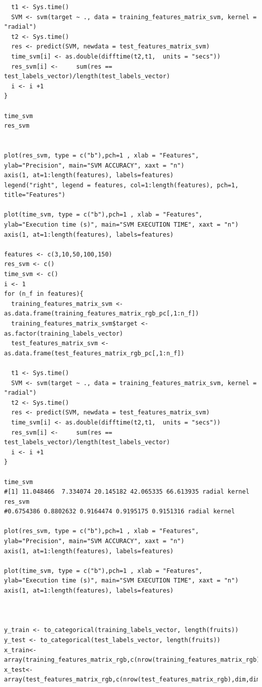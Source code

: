 \documentclass{article}
\begin{document}
\begin{verbatim}
  t1 <- Sys.time()
  SVM <- svm(target ~ ., data = training_features_matrix_svm, kernel = "radial")
  t2 <- Sys.time()
  res <- predict(SVM, newdata = test_features_matrix_svm)
  time_svm[i] <- as.double(difftime(t2,t1,  units = "secs"))
  res_svm[i] <-     sum(res == test_labels_vector)/length(test_labels_vector)
  i <- i +1
}

time_svm
res_svm


plot(res_svm, type = c("b"),pch=1 , xlab = "Features", 
ylab="Precision", main="SVM ACCURACY", xaxt = "n")
axis(1, at=1:length(features), labels=features)
legend("right", legend = features, col=1:length(features), pch=1, title="Features")

plot(time_svm, type = c("b"),pch=1 , xlab = "Features", 
ylab="Execution time (s)", main="SVM EXECUTION TIME", xaxt = "n")
axis(1, at=1:length(features), labels=features)

features <- c(3,10,50,100,150)
res_svm <- c()
time_svm <- c()
i <- 1
for (n_f in features){
  training_features_matrix_svm <- as.data.frame(training_features_matrix_rgb_pc[,1:n_f])
  training_features_matrix_svm$target <- as.factor(training_labels_vector)
  test_features_matrix_svm <- as.data.frame(test_features_matrix_rgb_pc[,1:n_f])
  
  t1 <- Sys.time()
  SVM <- svm(target ~ ., data = training_features_matrix_svm, kernel = "radial")
  t2 <- Sys.time()
  res <- predict(SVM, newdata = test_features_matrix_svm)
  time_svm[i] <- as.double(difftime(t2,t1,  units = "secs"))
  res_svm[i] <-     sum(res == test_labels_vector)/length(test_labels_vector)
  i <- i +1
}

time_svm
#[1] 11.048466  7.334074 20.145182 42.065335 66.613935 radial kernel
res_svm 
#0.6754386 0.8802632 0.9164474 0.9195175 0.9151316 radial kernel

plot(res_svm, type = c("b"),pch=1 , xlab = "Features", ylab="Precision", main="SVM ACCURACY", xaxt = "n")
axis(1, at=1:length(features), labels=features)

plot(time_svm, type = c("b"),pch=1 , xlab = "Features", ylab="Execution time (s)", main="SVM EXECUTION TIME", xaxt = "n")
axis(1, at=1:length(features), labels=features)



y_train <- to_categorical(training_labels_vector, length(fruits))
y_test <- to_categorical(test_labels_vector, length(fruits))
x_train<-array(training_features_matrix_rgb,c(nrow(training_features_matrix_rgb),dim,dim,3))
x_test<-array(test_features_matrix_rgb,c(nrow(test_features_matrix_rgb),dim,dim,3))


\end{verbatim}
\end{document}
